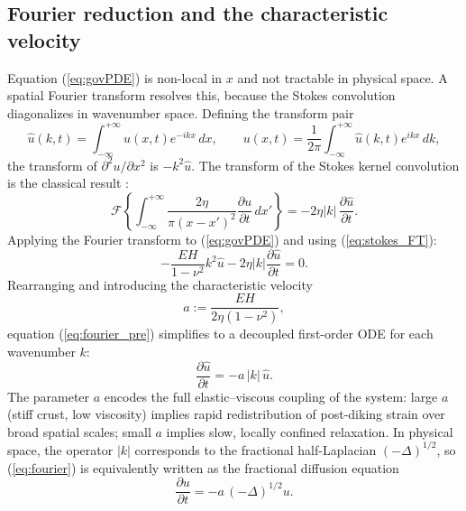 \documentclass[extra]{gji}
\begin{document}
\subsection{Fourier reduction and the characteristic velocity}
\label{sec:fourier}

Equation (\ref{eq:govPDE}) is non-local in $x$ and not tractable in physical
space. A spatial Fourier transform resolves this, because the Stokes convolution
diagonalizes in wavenumber space. Defining the transform pair
\begin{equation*}
\hat{u}(k,t) = \int_{-\infty}^{+\infty}u(x,t)e^{-ikx}\,dx,
\qquad
u(x,t) = \frac{1}{2\pi}\int_{-\infty}^{+\infty}\hat{u}(k,t)e^{ikx}\,dk,
\end{equation*}
the transform of $\partial^2 u/\partial x^2$ is $-k^2\hat{u}$. The transform
of the Stokes kernel convolution is the classical result
\citep{savage1978asthenosphere}:
\begin{equation}
\mathcal{F}\!\left\{
  \int_{-\infty}^{+\infty}\frac{2\eta}{\pi(x-x')^2}
  \frac{\partial u}{\partial t}\,dx'
\right\} = -2\eta|k|\,\frac{\partial\hat{u}}{\partial t}.
\label{eq:stokes_FT}
\end{equation}
Applying the Fourier transform to (\ref{eq:govPDE}) and using
(\ref{eq:stokes_FT}):
\begin{equation}
-\frac{EH}{1-\nu^2}k^2\hat{u} - 2\eta|k|\frac{\partial\hat{u}}{\partial t} = 0.
\label{eq:fourier_pre}
\end{equation}
Rearranging and introducing the characteristic velocity
\begin{equation}
\boxed{a := \frac{EH}{2\eta(1-\nu^2)}},
\label{eq:a}
\end{equation}
equation (\ref{eq:fourier_pre}) simplifies to a decoupled first-order ODE for
each wavenumber $k$:
\begin{equation}
\frac{\partial\hat{u}}{\partial t} = -a\,|k|\,\hat{u}.
\label{eq:fourier}
\end{equation}
The parameter $a$ encodes the full elastic--viscous coupling of the system:
large $a$ (stiff crust, low viscosity) implies rapid redistribution of
post-diking strain over broad spatial scales; small $a$ implies slow, locally
confined relaxation. In physical space, the operator $|k|$ corresponds to the
fractional half-Laplacian $(-\Delta)^{1/2}$, so (\ref{eq:fourier}) is
equivalently written as the fractional diffusion equation
\citep{metzler2000random,samko1993integration,samko1993fractional}
\begin{equation}
\frac{\partial u}{\partial t} = -a\,(-\Delta)^{1/2}u.
\label{eq:fractional}
\end{equation}
\end{document}
